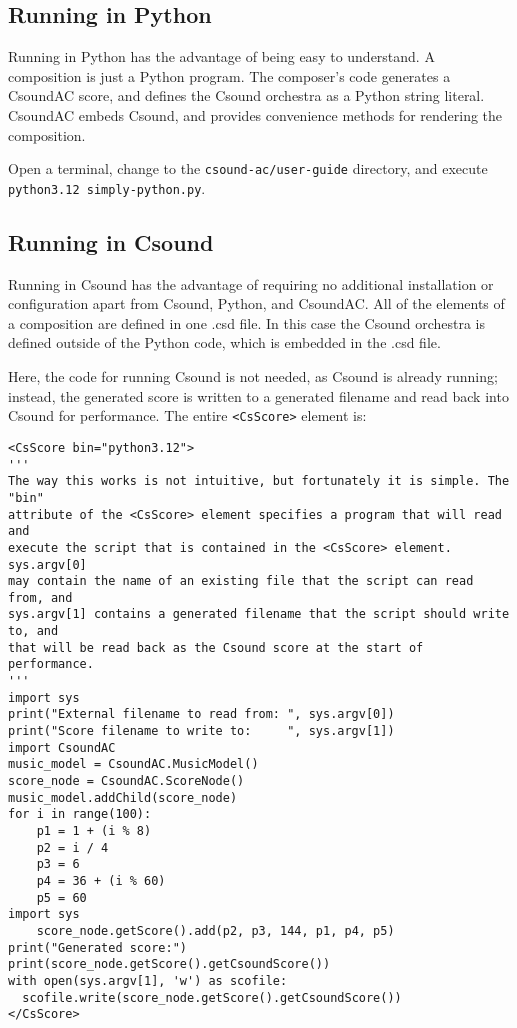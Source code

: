 \documentclass[letterpaper,10pt,DIV=12]{scrartcl}
\begin{document}
\subsection{Running in Python}

Running in Python has the advantage of being easy to understand. A composition is just a Python program. The composer's code generates a CsoundAC score, and defines the Csound orchestra as a Python string literal. CsoundAC embeds Csound, and provides convenience methods for rendering the composition.

Open a terminal, change to the \lstinline|csound-ac/user-guide| directory, and execute \lstinline|python3.12 simply-python.py|.

\subsection{Running in Csound}

Running in Csound has the advantage of requiring no additional installation or configuration apart from Csound, Python, and CsoundAC. All of the elements of a composition are defined in one .csd file. In this case the Csound orchestra is defined outside of the Python code, which is embedded in the .csd file.

Here, the code for running Csound is not needed, as Csound is already running; instead, the generated score is written to a generated filename and read back into Csound for performance. The entire \lstinline|<CsScore>| element is:

\begin{lstlisting}[basicstyle=\small\ttfamily]
<CsScore bin="python3.12">
'''
The way this works is not intuitive, but fortunately it is simple. The "bin" 
attribute of the <CsScore> element specifies a program that will read and 
execute the script that is contained in the <CsScore> element. sys.argv[0] 
may contain the name of an existing file that the script can read from, and 
sys.argv[1] contains a generated filename that the script should write to, and 
that will be read back as the Csound score at the start of performance.
'''
import sys
print("External filename to read from: ", sys.argv[0])
print("Score filename to write to:     ", sys.argv[1])
import CsoundAC
music_model = CsoundAC.MusicModel()
score_node = CsoundAC.ScoreNode()
music_model.addChild(score_node)
for i in range(100):
    p1 = 1 + (i % 8)
    p2 = i / 4
    p3 = 6
    p4 = 36 + (i % 60)
    p5 = 60
import sys
    score_node.getScore().add(p2, p3, 144, p1, p4, p5)
print("Generated score:")
print(score_node.getScore().getCsoundScore())
with open(sys.argv[1], 'w') as scofile:
  scofile.write(score_node.getScore().getCsoundScore())
</CsScore>
\end{lstlisting}
\end{document}
